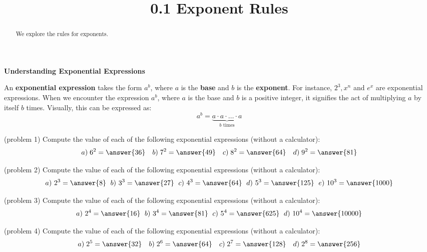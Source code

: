 \documentclass[handout]{ximera}
\title{0.1 Exponent Rules}
\begin{document}
\begin{abstract}
We explore the rules for exponents.
\end{abstract}



\maketitle

\begin{center}
\textbf{Understanding Exponential Expressions}
\end{center}

An \textbf{exponential expression} takes the form $a^b$, where $a$ is the \textbf{base}  and 
$b$ is the \textbf{exponent}.
For instance, $2^3, x^n$ and $e^x$ are exponential expressions. When we encounter the expression $a^b$, 
where $a$ is the base and $b$ is a positive integer, it signifies the act of multiplying $a$
by itself $b$ times. Visually, this can be expressed as:
\[
a^b = \underbrace{a \cdot a \cdot \ldots \cdot a}_\text{$b$ times} 
\]


\begin{problem}(problem 1)
Compute the value of each of the following exponential expressions (without a calculator):
\[
a) \;6^2 = \answer{36} \quad b) \;7^2 = \answer{49} \quad c) \;8^2 = \answer{64} \quad d) \;9^2 = \answer{81}
\]
\end{problem}

\begin{problem}(problem 2)
Compute the value of each of the following exponential expressions (without a calculator):
\[
a) \ 2^3 = \answer{8} \; \ b) \ 3^3 = \answer{27} \; \  c) \ 4^3 = \answer{64} \; \  d) \ 5^3 = \answer{125} 
 \; \  e) \ 10^3 = \answer{1000}
\]
\end{problem}

\begin{problem}(problem 3)
Compute the value of each of the following exponential expressions (without a calculator):
\[
a) \ 2^4 = \answer{16} \; \  b) \ 3^4 = \answer{81} \; \  c) \ 5^4 = \answer{625} \; \ d) \ 10^4 = \answer{10000}
\]
\end{problem}

\begin{problem}(problem 4)
Compute the value of each of the following exponential expressions (without a calculator):
\[
a) \;2^5 = \answer{32} \quad b) \;2^6 = \answer{64} \quad c) \;2^7 = \answer{128} \quad d) \;2^8 = \answer{256}
\]
\end{problem}
\end{document}
